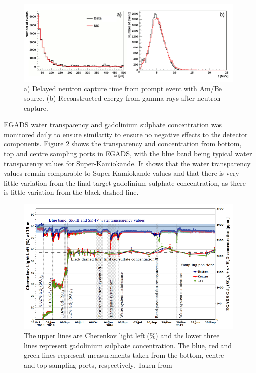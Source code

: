 \begin{figure}[H]
    \includegraphics[width=\textwidth]{Figures/egads_ambe.png}
\caption{a) Delayed neutron capture time from prompt event with Am/Be source. (b) Reconstructed energy from gamma rays after neutron capture.}
\label{fig:EGADS_ambe_capture}
\end{figure}

EGADS water transparency and gadolinium sulphate concentration was monitored daily to ensure similarity to ensure no negative effects to the detector components. Figure \ref{fig:egads_transparency} shows the transparency and concentration from bottom, top and centre sampling ports in EGADS, with the blue band being typical water transparency values for Super-Kamiokande. It shows that the water transparency values remain comparable to Super-Kamiokande values and that there is very little variation from the final target gadolinium sulphate concentration, as there is little variation from the black dashed line. 

\begin{figure}[H]
\includegraphics[width=\textwidth]{Figures/egads_concentration.png}
\caption{The upper lines are Cherenkov light left (\%) and the lower three lines represent gadolinium sulphate concentration. The blue, red and green lines represent measurements taken from the bottom, centre and top sampling ports, respectively. Taken from \cite{marti_evaluation_2020}}
\label{fig:egads_transparency}
\end{figure}

